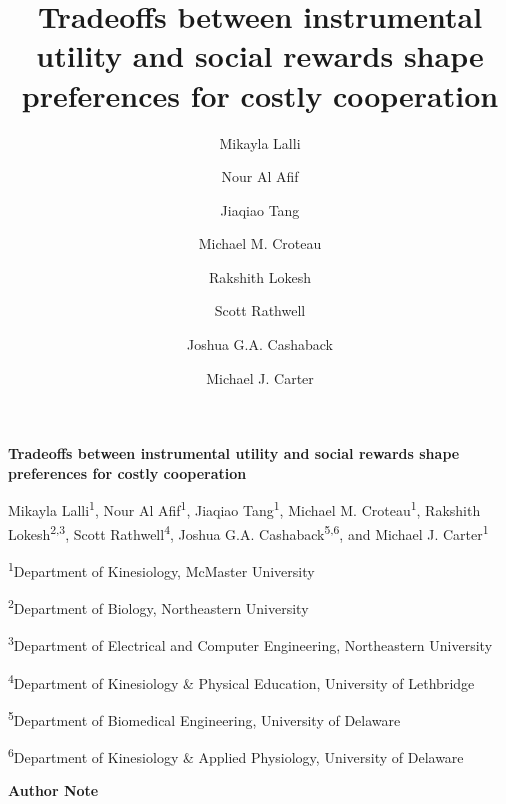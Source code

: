 \documentclass[
  11pt,
  letterpaper,
]{article}
\title{Tradeoffs between instrumental utility and social rewards shape
preferences for costly cooperation}
\author{Mikayla Lalli \and Nour Al Afif \and Jiaqiao Tang \and Michael
M. Croteau \and Rakshith Lokesh \and Scott Rathwell \and Joshua G.A.
Cashaback \and Michael J. Carter}
\date{}
\begin{document}
\begin{titlepage}

\thispagestyle{fancy}

\begingroup
\renewcommand{\baselinestretch}{2}\normalsize

\begin{center}

\vspace*{2cm}

{\bfseries Tradeoffs between instrumental utility and social rewards
shape preferences for costly cooperation \par}

\vspace{1cm}

Mikayla Lalli\textsuperscript{1}, Nour Al Afif\textsuperscript{1},
Jiaqiao Tang\textsuperscript{1}, Michael M. Croteau\textsuperscript{1},
Rakshith Lokesh\textsuperscript{2,3}, Scott Rathwell\textsuperscript{4},
Joshua G.A. Cashaback\textsuperscript{5,6}, and Michael J.
Carter\textsuperscript{1} \par

\vspace{0.5cm}

\textsuperscript{1}Department of Kinesiology, McMaster University \par
\textsuperscript{2}Department of Biology, Northeastern University \par
\textsuperscript{3}Department of Electrical and Computer Engineering,
Northeastern University \par
\textsuperscript{4}Department of Kinesiology \& Physical Education,
University of Lethbridge \par
\textsuperscript{5}Department of Biomedical Engineering, University of
Delaware \par
\textsuperscript{6}Department of Kinesiology \& Applied Physiology,
University of Delaware \par

\clearpage

{\bfseries Author Note \par}

\vspace{0.5cm}

\end{center}

\raggedright


\end{titlepage}
\end{document}
